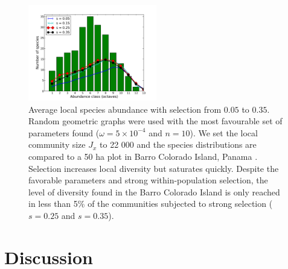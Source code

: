\documentclass[letterpaper,twocolumn,superscriptaddress,showkeys]{revtex4}
\begin{document}
\begin{figure}[ht!]
  \centering
    \includegraphics[width=0.50\textwidth]{fig-dist.pdf}
	\caption{
Average local species abundance with selection from $0.05$ to $0.35$. Random geometric graphs were used with the most favourable set of parameters found ($\omega = 5\times 10^{-4}$ and $n = 10$). We set the local community size $J_x$ to 22 000 and the species distributions are compared to a 50 ha plot in Barro Colorado Island, Panama \cite{con02}. Selection increases local diversity but saturates quickly. Despite the favorable parameters and strong within-population selection, the level of diversity found in the Barro Colorado Island is only reached in less than 5\% of the communities subjected to strong selection ($s = 0.25$ and $s = 0.35$).
}
\end{figure}

\section{Discussion}
\end{document}
